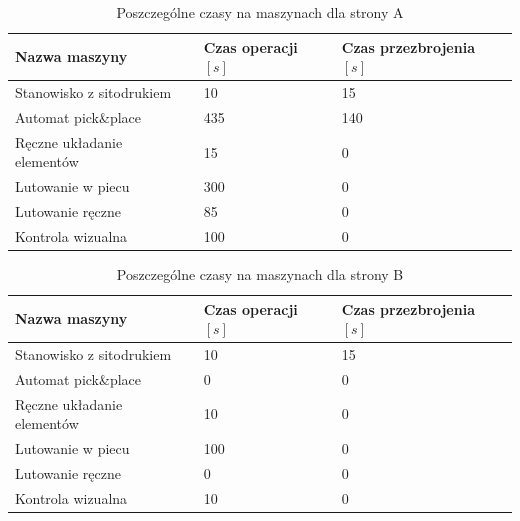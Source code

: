 \begin{table}[H]
	\centering
	\caption{Poszczególne czasy na maszynach dla strony A}
	\begin{tabular}{lll}
		\toprule
		Nazwa maszyny                 & Czas operacji $[s]$ & Czas przezbrojenia $[s]$ \\
		\midrule
		Stanowisko z sitodrukiem      & 10                  & 15                       \\
		Automat pick\&place           & 435                 & 140                      \\
		Ręczne układanie elementów & 15                  & 0                        \\
		Lutowanie w piecu             & 300                 & 0                        \\
		Lutowanie ręczne             & 85                  & 0                        \\
		Kontrola wizualna             & 100                 & 0                        \\
		\bottomrule
	\end{tabular}
	\label{chilliboard:A}
\end{table}

\begin{table}[H]
	\centering
	\caption{Poszczególne czasy na maszynach dla strony B}
	\begin{tabular}{lll}
		\toprule
		Nazwa maszyny                 & Czas operacji $[s]$ & Czas przezbrojenia $[s]$ \\
		\midrule
		Stanowisko z sitodrukiem      & 10                  & 15                       \\
		Automat pick\&place           & 0                   & 0                        \\
		Ręczne układanie elementów & 10                  & 0                        \\
		Lutowanie w piecu             & 100                 & 0                        \\
		Lutowanie ręczne             & 0                   & 0                        \\
		Kontrola wizualna             & 10                  & 0                        \\
		\bottomrule
	\end{tabular}
	\label{chilliboard:B}
\end{table}

